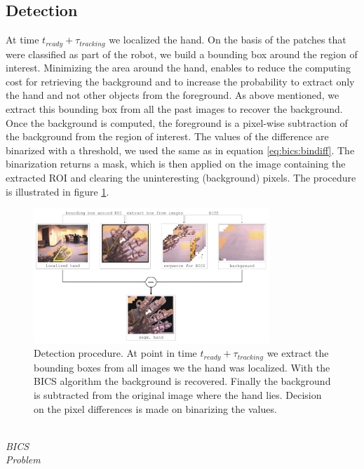 \subsection{Detection}\label{method:detection}
At time $t_{ready}+ \tau_{tracking}$ we localized the hand. On the basis of the patches that were classified as part of the robot, we build a bounding box around the region of interest. Minimizing the area around the hand, enables to reduce the computing cost for retrieving the background and to increase the probability to extract only the hand and not other objects from the foreground. As above mentioned, we extract this bounding box from all the past images to recover the background. Once the background is computed, the foreground is a pixel-wise subtraction of the background from the region of interest. The values of the difference are binarized with a threshold, we used the same as in equation \ref{eq:bics:bindiff}. The binarization returns a mask, which is then applied on the image containing the extracted ROI and clearing the uninteresting (background) pixels. The procedure is illustrated in figure \ref{fig:segmentation}.
%
\begin{figure}[ht]
	\begin{center}
		\includegraphics[width=3.5in]{imgs/method/segmentation.pdf}
	\end{center}
		\caption[Detection procedure. ]{Detection procedure. At point in time $t_{ready}+ \tau_{tracking}$ we extract the bounding boxes from all images we the hand was localized. With the BICS algorithm the background is recovered. Finally the background is subtracted from the original image where the hand lies. Decision on the pixel differences is made on binarizing the values.}
		\label{fig:segmentation}
\end{figure}
%
%
\\ \newline
\textit{BICS}\\ \newline
\textit{Problem}\\ \newline

